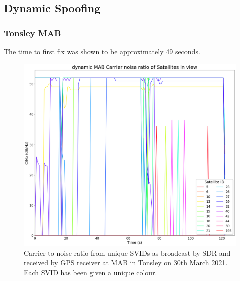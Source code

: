 \subsection{Dynamic Spoofing}

\subsubsection{Tonsley MAB}
The time to first fix was shown to be approximately 49 seconds.


\begin{figure}[h]
    \begin{centering}
        \includegraphics[width=14cm,keepaspectratio]{Figures/2021_3_30_dynamic_MAB Carrier noise ratio.png}
        \caption{Carrier to noise ratio from unique SVIDs as broadcast by SDR and received by GPS receiver at MAB in Tonsley on 30th March 2021. Each SVID has been given a unique colour.}
        \label{fig:MABdynamicCNo}
    \end{centering}
\end{figure}

